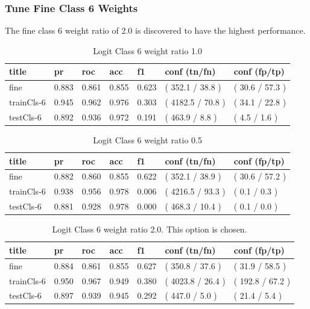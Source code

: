 \documentclass[ms]{nuthesis}
\begin{document}
\subsubsection{Tune Fine Class 6 Weights}
\par The fine class 6 weight ratio of 2.0 is discovered to have the highest performance.
\FloatBarrier
\begin{table}[H]
\centering
\caption{Logit Class 6 weight ratio 1.0}
\label{tab:LogRegCls6-Wt1}
\begin{tabular}{|l||l||l||l||l||l||l|}\toprule
title & pr & roc & acc & f1 & conf (tn/fn) & conf (fp/tp) \\ \midrule
fine & 0.883 & 0.861 & 0.855 & 0.623 & ( 352.1 / 38.8 ) & ( 30.6 / 57.3 ) \\
trainCls-6 & 0.945 & 0.962 & 0.976 & 0.303 & ( 4182.5 / 70.8 ) & ( 34.1 / 22.8 ) \\
testCls-6 & 0.892 & 0.936 & 0.972 & 0.191 & ( 463.9 / 8.8 ) & ( 4.5 / 1.6 ) \\ \bottomrule
\end{tabular}
\end{table}
\FloatBarrier

\FloatBarrier
\begin{table}[H]
\centering
\caption{Logit Class 6 weight ratio 0.5}
\label{tab:LogRegCls6-Wtp5}
\begin{tabular}{|l||l||l||l||l||l||l|}\toprule
title & pr & roc & acc & f1 & conf (tn/fn) & conf (fp/tp) \\ \midrule
fine & 0.882 & 0.860 & 0.855 & 0.622 & ( 352.1 / 38.9 ) & ( 30.6 / 57.2 ) \\
trainCls-6 & 0.938 & 0.956 & 0.978 & 0.006 & ( 4216.5 / 93.3 ) & ( 0.1 / 0.3 ) \\
testCls-6 & 0.881 & 0.928 & 0.978 & 0.000 & ( 468.3 / 10.4 ) & ( 0.1 / 0.0 ) \\ \bottomrule
\end{tabular}
\end{table}
\FloatBarrier


\FloatBarrier
\begin{table}[H]
\centering
\caption{Logit Class 6 weight ratio 2.0. This option is chosen.}
\label{tab:LogRegCls6-Wt2}
\begin{tabular}{|l||l||l||l||l||l||l|}\toprule
title & pr & roc & acc & f1 & conf (tn/fn) & conf (fp/tp) \\ \midrule
fine & 0.884 & 0.861 & 0.855 & 0.627 & ( 350.8 / 37.6 ) & ( 31.9 / 58.5 ) \\
trainCls-6 & 0.950 & 0.967 & 0.949 & 0.380 & ( 4023.8 / 26.4 ) & ( 192.8 / 67.2 ) \\
testCls-6 & 0.897 & 0.939 & 0.945 & 0.292 & ( 447.0 / 5.0 ) & ( 21.4 / 5.4 ) \\ \bottomrule
\end{tabular}
\end{table}
\FloatBarrier
\end{document}
